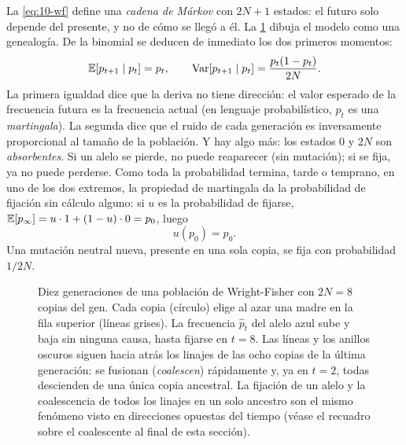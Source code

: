 La \cref{eq:10-wf} define una \emph{cadena de Márkov} con $2N+1$ estados: el futuro solo depende del presente, y no de cómo se llegó a él. La \cref{fig:10-genealogia} dibuja el modelo como una genealogía. De la binomial se deducen de inmediato los dos primeros momentos:
\begin{equation}\label{eq:10-momentos}
\mathbb{E}[p_{t+1}\mid p_t] = p_t, \qquad \operatorname{Var}[p_{t+1}\mid p_t] = \frac{p_t(1-p_t)}{2N}.
\end{equation}
La primera igualdad dice que la deriva no tiene dirección: el valor esperado de la frecuencia futura es la frecuencia actual (en lenguaje probabilístico, $p_t$ es una \emph{martingala}). La segunda dice que el ruido de cada generación es inversamente proporcional al tamaño de la población. Y hay algo más: los estados $0$ y $2N$ son \emph{absorbentes}. Si un alelo se pierde, no puede reaparecer (sin mutación); si se fija, ya no puede perderse. Como toda la probabilidad termina, tarde o temprano, en uno de los dos extremos, la propiedad de martingala da la probabilidad de fijación sin cálculo alguno: si $u$ es la probabilidad de fijarse, $\mathbb{E}[p_\infty]=u\cdot1+(1-u)\cdot0=p_0$, luego
\begin{equation}\label{eq:10-fijneutral}
u(p_0)=p_0 .
\end{equation}
Una mutación neutral nueva, presente en una sola copia, se fija con probabilidad $1/2N$.

\begin{figure}[t]
\centering
{}
\caption[Genealogía de Wright-Fisher]{Diez generaciones de una población de Wright-Fisher con $2N=8$ copias del gen. Cada copia (círculo) elige al azar una madre en la fila superior (líneas grises). La frecuencia $\hat p_t$ del alelo azul sube y baja sin ninguna causa, hasta fijarse en $t=8$. Las líneas y los anillos oscuros siguen hacia atrás los linajes de las ocho copias de la última generación: se fusionan (\emph{coalescen}) rápidamente y, ya en $t=2$, todas descienden de una única copia ancestral. La fijación de un alelo y la coalescencia de todos los linajes en un solo ancestro son el mismo fenómeno visto en direcciones opuestas del tiempo (véase el recuadro sobre el coalescente al final de esta sección).}
\label{fig:10-genealogia}
\end{figure}

